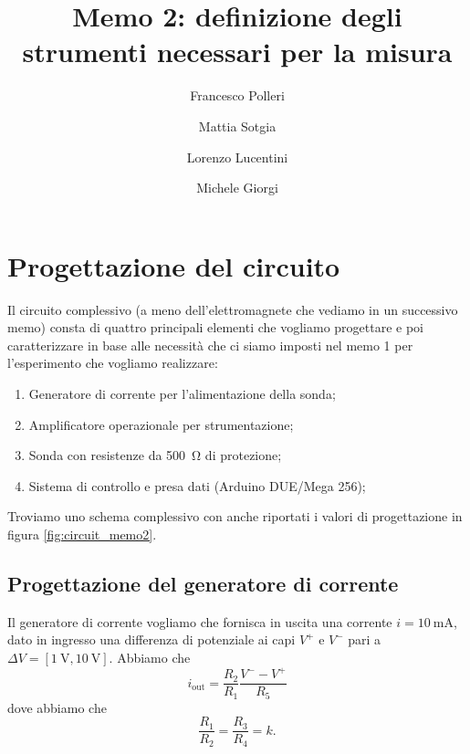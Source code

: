 \documentclass[fleqn,varvw,preprintnumbers,citeautoscript]{memo}
\begin{document}
\title{Memo 2: definizione degli strumenti necessari per la misura}

\author{Francesco Polleri}
\author{Mattia Sotgia}


\author{Lorenzo Lucentini}
\author{Michele Giorgi}

\revised{\today}

\begin{abstract}

\end{abstract}
\maketitle

\section{Progettazione del circuito}

Il circuito complessivo (a meno dell'elettromagnete che vediamo in un successivo memo) consta di quattro principali elementi che vogliamo progettare e poi caratterizzare in base alle necessità che ci siamo imposti nel memo 1 per l'esperimento che vogliamo realizzare: \begin{enumerate}[1.]
    \item Generatore di corrente per l'alimentazione della sonda;
    \item Amplificatore operazionale per strumentazione;
    \item Sonda con resistenze da \SI{500}{\ohm} di protezione;
    \item Sistema di controllo e presa dati (Arduino DUE/Mega 256);
\end{enumerate}

Troviamo uno schema complessivo con anche riportati i valori di progettazione in figura \ref{fig:circuit_memo2}.

\subsection{Progettazione del generatore di corrente}

Il generatore di corrente vogliamo che fornisca in uscita una corrente $i=\SI{10}{\milli\ampere}$, dato in ingresso una differenza di potenziale ai capi $V^+$ e $V^-$ pari a $\Delta V = [\SI{1}{\volt}, \SI{10}{\volt}]$. Abbiamo che \begin{equation}
    i_\text{out} = \frac{R_2}{R_1}\frac{V^--V^+}{R_5}\label{eq:gen}
\end{equation} dove abbiamo che \[\frac{R_1}{R_2} = \frac{R_3}{R_4}=k.\]
\end{document}
